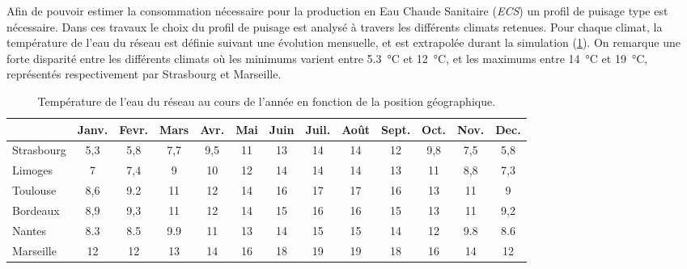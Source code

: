 Afin de pouvoir estimer la consommation nécessaire pour la production en Eau Chaude
Sanitaire (\emph{ECS}) un profil de puisage type est nécessaire. Dans ces travaux le
choix du profil de puisage est analysé à travers les différents climats retenues. Pour
chaque climat, la température de l’eau du réseau est définie suivant une évolution
mensuelle, et est extrapolée durant la simulation (\ref{tab:temp_eau}). On remarque une forte
disparité entre les différents climats où les minimums varient entre \SI{5.3}{\celsius} et
\SI{12}{\celsius}, et les maximums entre \SI{14}{\celsius} et \SI{19}{\celsius},
représentés respectivement par Strasbourg et Marseille.
\begin{table}
\centering
\begin{tabular}{l*{12}{c}}
    \toprule
               & Janv. & Fevr. & Mars & Avr. & Mai & Juin & Juil. & Août & Sept. & Oct. & Nov. & Dec. \\
    \midrule
    Strasbourg & 5,3   & 5,8   & 7,7  & 9,5  & 11  & 13   & 14    & 14   & 12    & 9,8  & 7,5  & 5,8  \\
    Limoges    & 7     & 7,4   & 9    & 10   & 12  & 14   & 14    & 14   & 13    & 11   & 8,8  & 7,3  \\
    Toulouse   & 8,6   & 9.2   & 11   & 12   & 14  & 16   & 17    & 17   & 16    & 13   & 11   & 9    \\
    Bordeaux   & 8,9   & 9,3   & 11   & 12   & 14  & 15   & 16    & 16   & 15    & 13   & 11   & 9,2  \\
    Nantes     & 8.3   & 8.5   & 9.9  & 11   & 13  & 14   & 15    & 15   & 14    & 12   & 9.8  & 8.6  \\
    Marseille  & 12    & 12    & 13   & 14   & 16  & 18   & 19    & 19   & 18    & 16   & 14   & 12   \\
    \bottomrule
\end{tabular}
\caption{Température de l'eau du réseau au cours de l'année en fonction de la
         position géographique.}
         \label{tab:temp_eau}
\end{table}


